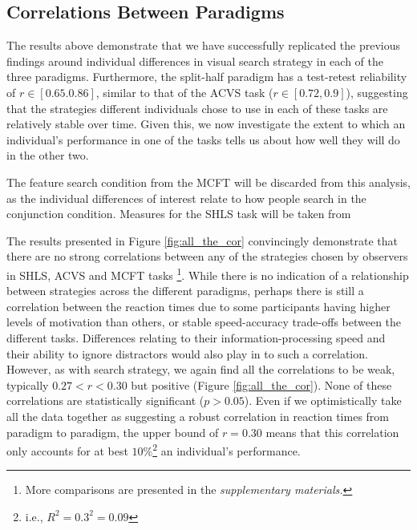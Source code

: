 \documentclass[]{rsos}%
\begin{document}
\subsection{Correlations Between Paradigms}

The results above demonstrate that we have successfully replicated the previous findings around individual differences in visual search strategy in each of the three paradigms. Furthermore, the split-half paradigm has a test-retest reliability of $r \in [0.65. 0.86]$, similar to that of the ACVS task ($r \in [0.72, 0.9]$), suggesting that the strategies different individuals chose to use in each of these tasks are relatively stable over time. Given this, we now investigate the extent to which an individual's performance in one of the tasks tells us about how well they will do in the other two. 

The feature search condition from the MCFT will be discarded from this analysis, as the individual differences of interest relate to how people search in the conjunction condition. Measures for the SHLS task will be taken from 


The results presented in Figure \ref{fig:all_the_cor} convincingly demonstrate that there are no strong correlations between any of the strategies chosen by observers in SHLS, ACVS and MCFT tasks \footnote{More comparisons are presented in the \textit{supplementary materials.}}. 
While there is no indication of a relationship between strategies across the different paradigms, perhaps there is still a correlation between the reaction times due to some participants having higher levels of motivation than others, or stable speed-accuracy trade-offs between the different tasks. Differences relating to their information-processing speed and their ability to ignore distractors would also play in to such a correlation. However, as with search strategy, we again find all the correlations to be weak, typically $0.27 < r <0.30$ but positive (Figure \ref{fig:all_the_cor}). None of these correlations are statistically significant ($p>0.05$). Even if we optimistically take all the data together as suggesting a robust correlation in reaction times from paradigm to paradigm, the upper bound of $r=0.30$ means that this correlation only accounts for at best $10\%$\footnote{i.e., $R^2 = 0.3^2 = 0.09$} an individual's performance. 

\end{document}
